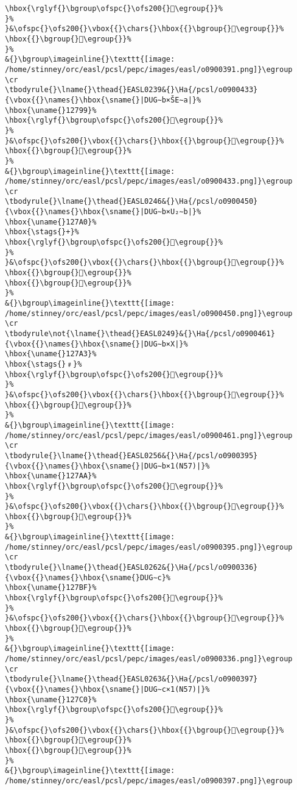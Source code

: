 \begin{verbatim}
\hbox{\rglyf{}\bgroup\ofspc{}\ofs200{}𒞍\egroup{}}%
}%
}&\ofspc{}\ofs200{}\vbox{{}\chars{}\hbox{{}\bgroup{}𒞳\egroup{}}%
\hbox{{}\bgroup{}𒞍\egroup{}}%
}%
&{}\bgroup\imageinline{}\texttt{[image: /home/stinney/orc/easl/pcsl/pepc/images/easl/o0900391.png]}\egroup
\cr
\tbodyrule{}\lname{}\thead{}EASL0239&{}\Ha{/pcsl/o0900433}{\vbox{{}\names{}\hbox{\sname{}|DUG∼b×ŠE∼a|}%
\hbox{\uname{}12799}%
\hbox{\rglyf{}\bgroup\ofspc{}\ofs200{}𒞙\egroup{}}%
}%
}&\ofspc{}\ofs200{}\vbox{{}\chars{}\hbox{{}\bgroup{}𒞴\egroup{}}%
\hbox{{}\bgroup{}𒞙\egroup{}}%
}%
&{}\bgroup\imageinline{}\texttt{[image: /home/stinney/orc/easl/pcsl/pepc/images/easl/o0900433.png]}\egroup
\cr
\tbodyrule{}\lname{}\thead{}EASL0246&{}\Ha{/pcsl/o0900450}{\vbox{{}\names{}\hbox{\sname{}|DUG∼b×U₂∼b|}%
\hbox{\uname{}127A0}%
\hbox{\stags{}+}%
\hbox{\rglyf{}\bgroup\ofspc{}\ofs200{}𒞠\egroup{}}%
}%
}&\ofspc{}\ofs200{}\vbox{{}\chars{}\hbox{{}\bgroup{}𒞶\egroup{}}%
\hbox{{}\bgroup{}𒞺\egroup{}}%
\hbox{{}\bgroup{}𒞠\egroup{}}%
}%
&{}\bgroup\imageinline{}\texttt{[image: /home/stinney/orc/easl/pcsl/pepc/images/easl/o0900450.png]}\egroup
\cr
\tbodyrule\not{\lname{}\thead{}EASL0249}&{}\Ha{/pcsl/o0900461}{\vbox{{}\names{}\hbox{\sname{}|DUG∼b×X|}%
\hbox{\uname{}127A3}%
\hbox{\stags{}﹟}%
\hbox{\rglyf{}\bgroup\ofspc{}\ofs200{}𒞣\egroup{}}%
}%
}&\ofspc{}\ofs200{}\vbox{{}\chars{}\hbox{{}\bgroup{}𒞷\egroup{}}%
\hbox{{}\bgroup{}𒞣\egroup{}}%
}%
&{}\bgroup\imageinline{}\texttt{[image: /home/stinney/orc/easl/pcsl/pepc/images/easl/o0900461.png]}\egroup
\cr
\tbodyrule{}\lname{}\thead{}EASL0256&{}\Ha{/pcsl/o0900395}{\vbox{{}\names{}\hbox{\sname{}|DUG∼b×1(N57)|}%
\hbox{\uname{}127AA}%
\hbox{\rglyf{}\bgroup\ofspc{}\ofs200{}𒞪\egroup{}}%
}%
}&\ofspc{}\ofs200{}\vbox{{}\chars{}\hbox{{}\bgroup{}𒞸\egroup{}}%
\hbox{{}\bgroup{}𒞪\egroup{}}%
}%
&{}\bgroup\imageinline{}\texttt{[image: /home/stinney/orc/easl/pcsl/pepc/images/easl/o0900395.png]}\egroup
\cr
\tbodyrule{}\lname{}\thead{}EASL0262&{}\Ha{/pcsl/o0900336}{\vbox{{}\names{}\hbox{\sname{}DUG∼c}%
\hbox{\uname{}127BF}%
\hbox{\rglyf{}\bgroup\ofspc{}\ofs200{}𒞿\egroup{}}%
}%
}&\ofspc{}\ofs200{}\vbox{{}\chars{}\hbox{{}\bgroup{}𒞼\egroup{}}%
\hbox{{}\bgroup{}𒞿\egroup{}}%
}%
&{}\bgroup\imageinline{}\texttt{[image: /home/stinney/orc/easl/pcsl/pepc/images/easl/o0900336.png]}\egroup
\cr
\tbodyrule{}\lname{}\thead{}EASL0263&{}\Ha{/pcsl/o0900397}{\vbox{{}\names{}\hbox{\sname{}|DUG∼c×1(N57)|}%
\hbox{\uname{}127C0}%
\hbox{\rglyf{}\bgroup\ofspc{}\ofs200{}𒟀\egroup{}}%
}%
}&\ofspc{}\ofs200{}\vbox{{}\chars{}\hbox{{}\bgroup{}𒞾\egroup{}}%
\hbox{{}\bgroup{}𒞽\egroup{}}%
\hbox{{}\bgroup{}𒟀\egroup{}}%
}%
&{}\bgroup\imageinline{}\texttt{[image: /home/stinney/orc/easl/pcsl/pepc/images/easl/o0900397.png]}\egroup

\end{verbatim}
